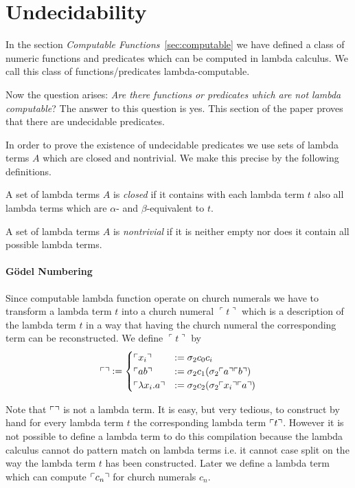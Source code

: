 \section{Undecidability}

In the section \emph{Computable Functions}~\ref{sec:computable} we have
defined a class of numeric functions and predicates which can be computed in
lambda calculus. We call this class of functions/predicates lambda-computable.

Now the question arises: \emph{Are there functions or predicates which are not
  lambda computable}? The answer to this question is yes. This section of the
paper proves that there are undecidable predicates.

In order to prove the existence of undecidable predicates we use sets of
lambda terms $A$ which are closed and nontrivial. We make this precise by the
following definitions.

\begin{definition}
  A set of lambda terms $A$ is \emph{closed} if it contains with each lambda term $t$
  also all lambda terms which are $\alpha$- and $\beta$-equivalent to $t$.
\end{definition}


\begin{definition}
  A set of lambda terms $A$ is \emph{nontrivial} if it is neither empty nor
  does it contain all possible lambda terms.
\end{definition}

\paragraph{Gödel Numbering}
Since computable lambda function operate on church numerals we have to
transform a lambda term $t$ into a church numeral $\ulcorner t \urcorner$
which is a description of the lambda term $t$ in a way that having the church
numeral the corresponding term can be reconstructed. We define $\ulcorner t
\urcorner$ by
$$
\ulcorner  \urcorner :=
\begin{cases}
  \ulcorner x_i \urcorner &:= \sigma_2 c_0 c_i \\
  \ulcorner a b \urcorner &:= \sigma_2 c_1 (\sigma_2 \ulcorner a \urcorner \ulcorner b \urcorner) \\
  \ulcorner \lambda x_i. a \urcorner
    &:=  \sigma_2 c_2 (\sigma_2 \ulcorner x_i \urcorner \ulcorner a \urcorner)
\end{cases}
$$

Note that $\ulcorner  \urcorner$ is not a lambda term. It is easy, but very tedious, to
construct by hand for every lambda term $t$ the corresponding lambda term
$\ulcorner t \urcorner$. However it is not possible to define a lambda term to do this
compilation because the lambda calculus cannot do pattern match on lambda
terms i.e. it cannot case split on the way the lambda term $t$ has been
constructed. Later we define a lambda term which can compute $\ulcorner c_n \urcorner$
for church numerals $c_n$.


